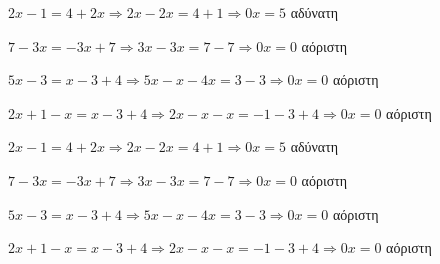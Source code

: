 \begin{alist}
\item $ 2x-1=4+2x\Rightarrow 2x-2x=4+1\Rightarrow 0x=5 $ αδύνατη
\item $ 7-3x=-3x+7\Rightarrow 3x-3x=7-7\Rightarrow 0x=0 $ αόριστη
\item $ 5x-3=x-3+4\Rightarrow 5x-x-4x=3-3\Rightarrow 0x=0 $ αόριστη
\item $ 2x+1-x=x-3+4\Rightarrow 2x-x-x=-1-3+4\Rightarrow 0x=0 $ αόριστη
\end{alist}
\begin{alist}
\item $ 2x-1=4+2x\Rightarrow 2x-2x=4+1\Rightarrow 0x=5 $ αδύνατη
\item $ 7-3x=-3x+7\Rightarrow 3x-3x=7-7\Rightarrow 0x=0 $ αόριστη
\item $ 5x-3=x-3+4\Rightarrow 5x-x-4x=3-3\Rightarrow 0x=0 $ αόριστη
\item $ 2x+1-x=x-3+4\Rightarrow 2x-x-x=-1-3+4\Rightarrow 0x=0 $ αόριστη
\end{alist}
